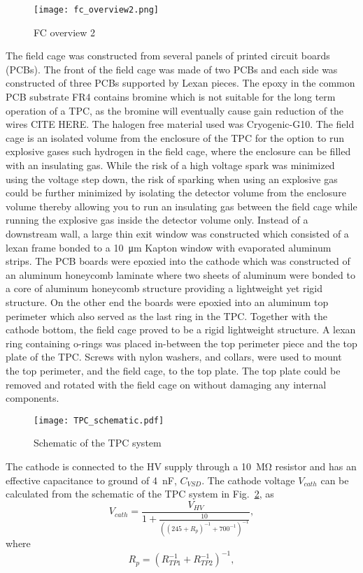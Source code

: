 \begin{figure}[!htb]
\texttt{[image: fc\_overview2.png]}
\label{fig:fc_overview2}
\caption{FC overview 2}
\end{figure}

The field cage was constructed from several panels of printed circuit boards (PCBs). The front of the field cage was made of two PCBs and each side was constructed of three PCBs supported by Lexan pieces. The epoxy in the common PCB substrate FR4 contains bromine which is not suitable for the long term operation of a TPC, as the bromine will eventually cause gain reduction of the wires CITE HERE. The halogen free material used was Cryogenic-G10.  The field cage is an isolated volume from the enclosure of the TPC for the option to run explosive gases such hydrogen in the field cage, where the enclosure can be filled with an insulating gas. While the risk of a high voltage spark was minimized using the voltage step down, the risk of sparking when using an explosive gas could be further minimized by isolating the detector volume from the enclosure volume thereby allowing you to run an insulating gas between the field cage while running the explosive gas inside the detector volume only. Instead of a downstream wall, a large thin exit window was constructed which consisted of a lexan frame bonded to a \SI{10}{\micro\metre} Kapton window with evaporated aluminum strips. The PCB boards were epoxied into the cathode which was constructed of an aluminum honeycomb laminate where two sheets of aluminum were bonded to a core of aluminum honeycomb structure providing a lightweight yet rigid structure. On the other end the boards were epoxied into an aluminum top perimeter which also served as the last ring in the TPC. Together with the cathode bottom, the field cage proved to be a rigid lightweight structure. A lexan ring containing o-rings was placed in-between the top perimeter piece and the top plate of the TPC. Screws with nylon washers, and collars, were used to mount the top perimeter, and the field cage, to the top plate. The top plate could be removed and rotated with the field cage on without damaging any internal components. 

\begin{figure}[!htb]
\centering
\texttt{[image: TPC\_schematic.pdf]}
\caption{Schematic of the TPC system}
\label{fig:TPC_schematic}
\end{figure}

The cathode is connected to the HV supply through a \SI{10}{\mega\ohm} resistor and has an effective capacitance to ground of \SI{4}{\nano\farad}, $C_{VSD}$. The cathode voltage $V_{cath}$ can be calculated from the schematic of the TPC system in Fig.~\ref{fig:TPC_schematic}, as
\begin{equation}
V_{cath} = \frac{V_{HV}}{ 1 + \frac{10}{ \left( (245 + R_p)^{-1} + 700^{-1} \right)^{-1} } },
\end{equation}
where 
\begin{equation}
R_p = \left( R_{TP1}^{-1} + R_{TP2}^{-1} \right)^{-1},
 \label{eq:Reff}
\end{equation} 

